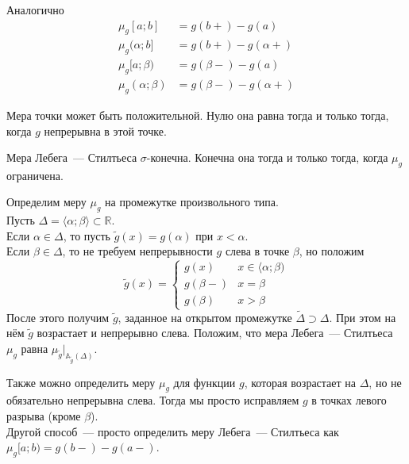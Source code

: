 \documentclass{article}
\begin{document}
    \begin{property}
        Аналогично
        \begin{align*}
            \mu_g[a;b]&=g(b+)-g(a)\\
            \mu_g(\alpha;b]&=g(b+)-g(\alpha+)\\
            \mu_g[a;\beta)&=g(\beta-)-g(a)\\
            \mu_g(\alpha;\beta)&=g(\beta-)-g(\alpha+)
        \end{align*}
    \end{property}
    \begin{remark}
        Мера точки может быть положительной. Нулю она равна тогда и только тогда, когда $g$ непрерывна в этой точке.
    \end{remark}
    \begin{property}
        Мера Лебега~--- Стилтьеса $\sigma$-конечна. Конечна она тогда и только тогда, когда $\mu_g$ ограничена.
    \end{property}
    \begin{definition}
        Определим меру $\mu_g$ на промежутке произвольного типа.\\
        Пусть $\Delta=\langle\alpha;\beta\rangle\subset\mathbb R$.\\
        Если $\alpha\in\Delta$, то пусть $\widetilde g(x)=g(\alpha)$ при $x<\alpha$.\\
        Если $\beta\in\Delta$, то не требуем непрерывности $g$ слева в точке $\beta$, но положим
        $$\widetilde g(x)=\begin{cases}
            g(x) & x\in\langle\alpha;\beta)\\
            g(\beta-) & x=\beta\\
            g(\beta) & x>\beta
        \end{cases}$$
        После этого получим $\widetilde g$, заданное на открытом промежутке $\widetilde\Delta\supset\Delta$. При этом на нём $\widetilde g$ возрастает и непрерывно слева. Положим, что мера Лебега~--- Стилтьеса $\mu_g$ равна $\mu_{\widetilde g}\big|_{\mathbb A_{\widetilde g}(\Delta)}$.
    \end{definition}
    \begin{remark}
        Также можно определить меру $\mu_g$ для функции $g$, которая возрастает на $\Delta$, но не обязательно непрерывна слева. Тогда мы просто исправляем $g$ в точках левого разрыва (кроме $\beta$).\\
        Другой способ~--- просто определить меру Лебега~--- Стилтьеса как $\mu_g[a;b)=g(b-)-g(a-)$.
    \end{remark}
\end{document}
